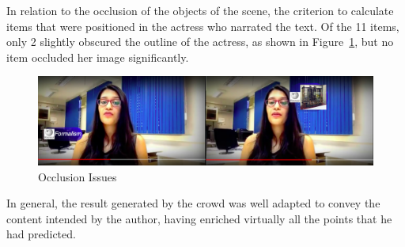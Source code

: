 In relation to the occlusion of the objects of the scene, the criterion to calculate items that were positioned in the actress who narrated the text. Of the 11 items, only 2 slightly obscured the outline of the actress, as shown in Figure~\ref{oclusion}, but no item occluded her image significantly.

\begin{figure}[h!]
	\centerline{\includegraphics[scale=0.19] {figure/occlusion}}
	\caption{Occlusion Issues}
	\label{oclusion}
\end{figure}

In general, the result generated by the crowd was well adapted to convey the content intended by the author, having enriched virtually all the points that he had predicted.



















